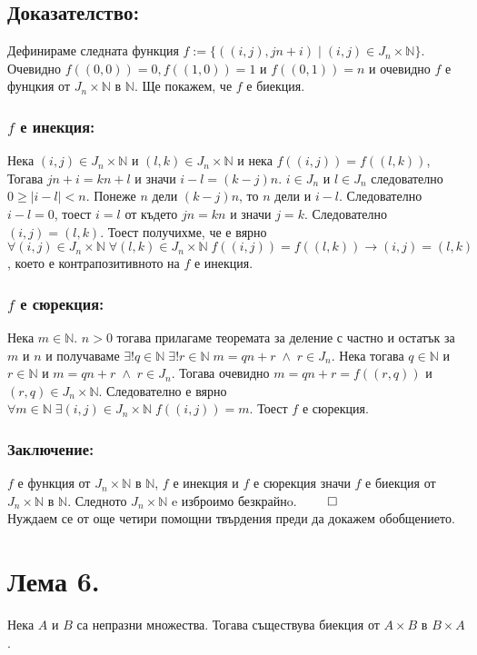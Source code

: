 \documentclass[a4paper, 12pt, oneside]{article}
\newcommand{\N}{\mathbb{N}}
\begin{document}
\subsection*{Доказателство:}
Дефинираме следната функция \(f := \{((i, j), jn + i) \; | \; (i, j) \in J_n \times \N\}\).
Очевидно \(f((0, 0)) = 0, f((1, 0)) = 1\) и \(f((0, 1)) = n\)
и очевидно \(f\) е фунцкия от \(J_n \times \N\) в \(\N\). Ще покажем, че \(f\) е биекция.
\subsubsection*{\(f\) е инекция:}
Нека \((i, j) \in J_n \times \N\) и \((l, k) \in J_n \times \N\) и нека \(f((i, j)) = f((l, k))\),
Тогава \(jn + i = kn + l\) и значи \(i - l = (k - j)n\). \(i \in J_n\) и \(l \in J_n\)
следователно \(0 \geq |i - l| < n\). Понеже \(n\) дели \((k - j)n\), то \(n\) дели и \(i - l\).
Следователно \(i - l = 0\), тоест \(i = l\) от където \(jn = kn\) и значи \(j = k\).
Следователно \((i, j) = (l, k)\).
Тоест получихме, че е вярно \(\forall (i, j) \in J_n \times \N \; \forall (l, k) \in J_n \times \N \; f((i, j)) = f((l, k)) \longrightarrow (i, j) = (l, k)\),
което е контрапозитивното на \(f\) е инекция.
\subsubsection*{\(f\) е сюрекция:}
Нека \(m \in \N\). \(n > 0\) тогава прилагаме теоремата за деление с частно и остатък за \(m\) и \(n\)
и получаваме \(\exists! q \in \N \; \exists! r \in \N \; m = qn + r \; \land \; r \in J_n\).
Нека тогава \(q \in \N\) и \(r \in \N\) и \(m = qn + r \; \land \; r \in J_n\).
Тогава очевидно \(m = qn + r = f((r, q))\) и \((r, q) \in J_n \times \N\).
Следователно е вярно \(\forall m \in \N \; \exists (i, j) \in J_n \times \N \; f((i, j)) = m\).
Тоест \(f\) е сюрекция.
\subsubsection*{Заключение:}
\(f\) е функция от \(J_n \times \N\)  в \(\N\),  \(f\) е инекция и \(f\) е сюрекция
значи \(f\) е биекция от \(J_n \times \N\)  в \(\N\). Следното \(J_n \times \N\) e изброимо безкрайнo. \(\qed\) \\
Нуждаем се от още четири помощни твърдения преди да докажем обобщението.
\section*{Лема 6.}
Нека \(A\) и \(B\) са непразни множества.
Тогава съществува биекция от \(A \times B\) в \(B \times A\).
\end{document}
